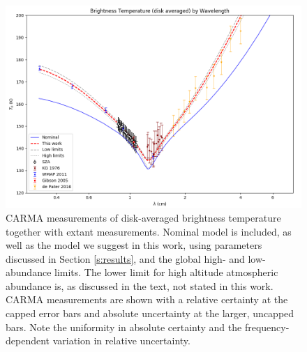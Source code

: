 \documentclass{article}
\begin{document}
	\begin{figure}
		\centering
		\includegraphics[width=\textwidth]{final_models_wl.png}
		\caption{\label{fig:emission_wl}CARMA measurements of disk-averaged brightness temperature together with extant measurements. Nominal model is included, as well as the model we suggest in this work, using parameters discussed in Section \ref{s:results}, and the global high- and low-abundance limits. The lower limit for high altitude atmospheric abundance is, as discussed in the text, not stated in this work. CARMA measurements are shown with a relative certainty at the capped error bars and absolute uncertainty at the larger, uncapped bars. Note the uniformity in absolute certainty and the frequency-dependent variation in relative uncertainty.}
	\end{figure}
\end{document}
